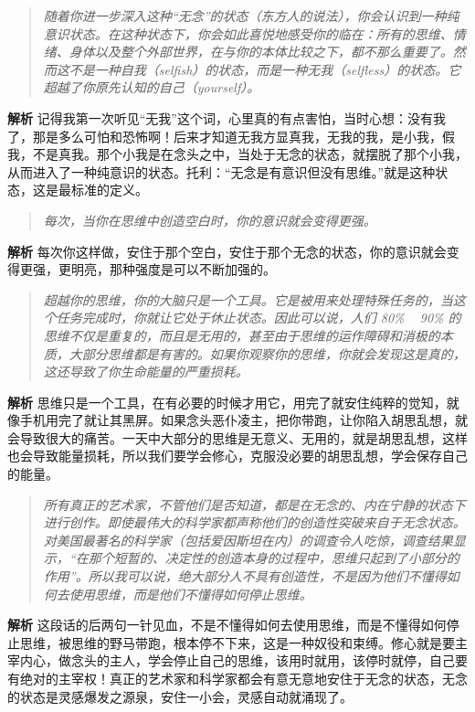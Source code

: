 \begin{quote}\it
    随着你进一步深入这种“无念”的状态（东方人的说法），你会认识到一种纯意识状态。在这种状态下，你会如此喜悦地感受你的临在：所有的思维、情绪、身体以及整个外部世界，在与你的本体比较之下，都不那么重要了。然而这不是一种自我（selfish）的状态，而是一种无我（selfless）的状态。它超越了你原先认知的自己（yourself）。
\end{quote}

\textbf{解析} 记得我第一次听见“无我”这个词，心里真的有点害怕，当时心想：没有我了，那是多么可怕和恐怖啊！后来才知道无我方显真我，无我的我，是小我，假我，不是真我。那个小我是在念头之中，当处于无念的状态，就摆脱了那个小我，从而进入了一种纯意识的状态。托利：“无念是有意识但没有思维。”就是这种状态，这是最标准的定义。

\begin{quote}\it
    每次，当你在思维中创造空白时，你的意识就会变得更强。
\end{quote}

\textbf{解析} 每次你这样做，安住于那个空白，安住于那个无念的状态，你的意识就会变得更强，更明亮，那种强度是可以不断加强的。

\begin{quote}\it
    超越你的思维，你的大脑只是一个工具。它是被用来处理特殊任务的，当这个任务完成时，你就让它处于休止状态。因此可以说，人们 80\% ~ 90\% 的思维不仅是重复的，而且是无用的，甚至由于思维的运作障碍和消极的本质，大部分思维都是有害的。如果你观察你的思维，你就会发现这是真的，这还导致了你生命能量的严重损耗。
\end{quote}

\textbf{解析} 思维只是一个工具，在有必要的时候才用它，用完了就安住纯粹的觉知，就像手机用完了就让其黑屏。如果念头恶仆凌主，把你带跑，让你陷入胡思乱想，就会导致很大的痛苦。一天中大部分的思维是无意义、无用的，就是胡思乱想，这样也会导致能量损耗，所以我们要学会修心，克服没必要的胡思乱想，学会保存自己的能量。

\begin{quote}\it
    所有真正的艺术家，不管他们是否知道，都是在无念的、内在宁静的状态下进行创作。即使最伟大的科学家都声称他们的创造性突破来自于无念状态。对美国最著名的科学家（包括爱因斯坦在内）的调查令人吃惊，调查结果显示，“在那个短暂的、决定性的创造本身的过程中，思维只起到了小部分的作用”。所以我可以说，绝大部分人不具有创造性，不是因为他们不懂得如何去使用思维，而是他们不懂得如何停止思维。
\end{quote}

\textbf{解析} 这段话的后两句一针见血，不是不懂得如何去使用思维，而是不懂得如何停止思维，被思维的野马带跑，根本停不下来，这是一种奴役和束缚。修心就是要主宰内心，做念头的主人，学会停止自己的思维，该用时就用，该停时就停，自己要有绝对的主宰权！真正的艺术家和科学家都会有意无意地安住于无念的状态，无念的状态是灵感爆发之源泉，安住一小会，灵感自动就涌现了。

